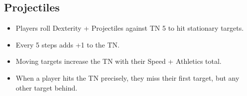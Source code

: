 \subsection*{Projectiles}

\begin{itemize}
  \item
  Players roll Dexterity + Projectiles against TN 5 to hit stationary targets.
  \item
  Every 5 steps adds +1 to the TN.
  \item
  Moving targets increase the TN with their Speed + Athletics total.
  \item
  When a player hits the TN precisely, they miss their first target, but any other target behind.
\end{itemize}

